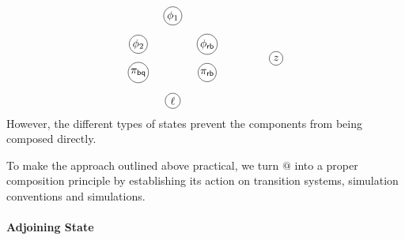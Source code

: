 \documentclass[acmsmall,screen,review,anonymous]{acmart}
\newcommand{\kw}[1]{\ensuremath{ \mathsf{#1} }}
\begin{document}
\begin{example}
\[\begin{tikzpicture}[yscale=0.45,xscale=1.1,baseline=(z.base)]
    \begin{scope}[every node/.style={circle,draw,fill=white,inner sep=1pt}]
      \node at (0,4) {$\phi_1$};
      \node at (-1,2) {$\phi_2$};
      \node at (+1,2) {$\phi_\kw{rb}$};
      \node at (-1,0) {$\pi_\kw{bq}$};
      \node at (+1,0) {$\pi_\kw{rb}$};
      \node[inner sep=2pt] at (0,-2) {$\ell$};
      \node[inner sep=2pt] (z) at (+3,1) {$z$};
    \end{scope}
  \end{tikzpicture}
\]
However, the different types of states
prevent the components
from being composed directly.
\end{example}

To make the approach outlined above practical,
we turn $@$ into a proper composition principle
by establishing its action on
transition systems,
simulation conventions and
simulations.


\paragraph{Adjoining State} \label{sec:overview:slift} %
\end{document}
